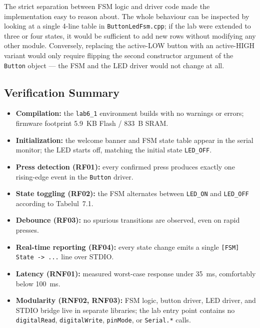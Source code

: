The strict separation between FSM logic and driver code made the implementation easy to reason about. The whole behaviour can be inspected by looking at a single 4-line table in \texttt{ButtonLedFsm.cpp}; if the lab were extended to three or four states, it would be sufficient to add new rows without modifying any other module. Conversely, replacing the active-LOW button with an active-HIGH variant would only require flipping the second constructor argument of the \texttt{Button} object --- the FSM and the LED driver would not change at all.

\subsection{Verification Summary}

\begin{itemize}
    \item \textbf{Compilation:} the \texttt{lab6\_1} environment builds with no warnings or errors; firmware footprint 5.9~KB Flash / 833~B SRAM.
    \item \textbf{Initialization:} the welcome banner and FSM state table appear in the serial monitor; the LED starts off, matching the initial state \texttt{LED\_OFF}.
    \item \textbf{Press detection (RF01):} every confirmed press produces exactly one rising-edge event in the \texttt{Button} driver.
    \item \textbf{State toggling (RF02):} the FSM alternates between \texttt{LED\_ON} and \texttt{LED\_OFF} according to Tabelul~7.1.
    \item \textbf{Debounce (RF03):} no spurious transitions are observed, even on rapid presses.
    \item \textbf{Real-time reporting (RF04):} every state change emits a single \texttt{[FSM] State -> ...} line over STDIO.
    \item \textbf{Latency (RNF01):} measured worst-case response under 35~ms, comfortably below 100~ms.
    \item \textbf{Modularity (RNF02, RNF03):} FSM logic, button driver, LED driver, and STDIO bridge live in separate libraries; the lab entry point contains no \texttt{digitalRead}, \texttt{digitalWrite}, \texttt{pinMode}, or \texttt{Serial.*} calls.
\end{itemize}

